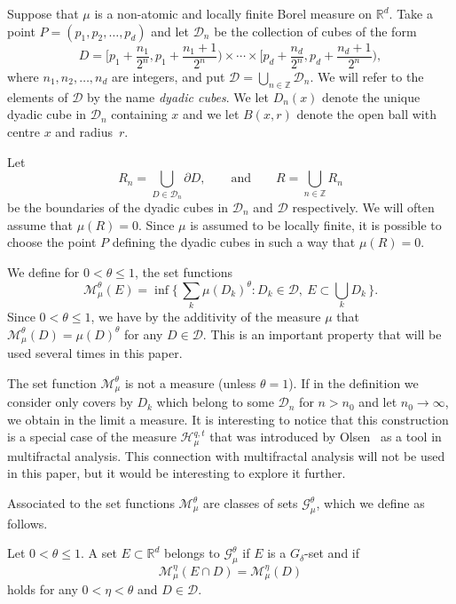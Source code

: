 \documentclass[AHL,Unicode,longabstracts]{cedram}
\begin{document}
Suppose that $\mu$ is a non-atomic and locally finite Borel measure on $\mathbb{R}^d$. Take a point $P = (p_1, p_2, \ldots, p_d)$ and let $\mathscr{D}_n$ be the collection of cubes of the form
\[
D = \biggl[p_1 + \frac{n_1}{2^n}, p_1 + \frac{n_1 + 1}{2^n} \biggr)
\times \cdots \times \biggl[p_d + \frac{n_d}{2^n}, p_d + \frac{n_d + 1}{2^n} \biggr),
\]
where $n_1, n_2, \ldots, n_d$ are integers, and put $\mathscr{D} =
\bigcup_{n \in \mathbb{Z}} \mathscr{D}_n$. We will refer to the elements of $\mathscr{D}$ by the name {\em dyadic cubes}. We let $D_n (x)$ denote the unique dyadic cube in $\mathscr{D}_n$ containing $x$ and we let $B(x,r)$ denote the open ball with centre $x$ and radius~$r$.

Let
\[
R_n = \bigcup_{D \in \mathscr{D}_n} \partial D, \qquad \text{and} \qquad R = \bigcup_{n \in \mathbb{Z}} R_n
\]
be the boundaries of the dyadic cubes in $\mathscr{D}_n$ and $\mathscr{D}$ respectively. We will often assume that $\mu (R) = 0$. Since $\mu$ is assumed to be locally finite, it is possible to choose the point $P$ defining the dyadic cubes in such a way that $\mu (R) = 0$.

We define for $0 < \theta \leq 1$, the set functions
\[
\mathscr{M}_\mu^\theta (E) = \inf \biggl\{\, \sum_k \mu (D_k)^\theta : D_k \in \mathscr{D},\ E \subset \bigcup_k D_k \,\biggr\}.
\]
Since $0 < \theta \leq 1$, we have by the additivity of the measure $\mu$ that $\mathscr{M}_\mu^\theta (D) = \mu (D)^\theta$ for any $D
\in \mathscr{D}$. This is an important property that will be used several times in this paper.

The set function $\mathscr{M}_\mu^\theta$ is not a measure (unless $\theta = 1$). If in the definition we consider only covers by $D_k$ which belong to some $\mathscr{D}_n$ for $n > n_0$ and let $n_0 \to \infty$, we obtain in the limit a measure. It is interesting to notice that this construction is a special case of the measure $\mathscr{H}_\mu^{q,t}$ that was introduced by Olsen~\cite{olsen} as a tool in multifractal analysis. This connection with multifractal analysis will not be used in this paper, but it would be interesting to explore it further.

Associated to the set functions $\mathscr{M}_\mu^\theta$ are classes of sets $\mathscr{G}_\mu^\theta$, which we define as follows.

\begin{defi}\label{def:class}
Let $0 < \theta \leq 1$. A set $E \subset \mathbb{R}^d$ belongs to $\mathscr{G}_\mu^\theta$ if $E$ is a $G_\delta$-set and if
\[
\mathscr{M}_\mu^\eta (E \cap D) = \mathscr{M}_\mu^\eta (D)
\]
holds for any $0 < \eta < \theta$ and $D \in \mathscr{D}$.
\end{defi}
\end{document}
